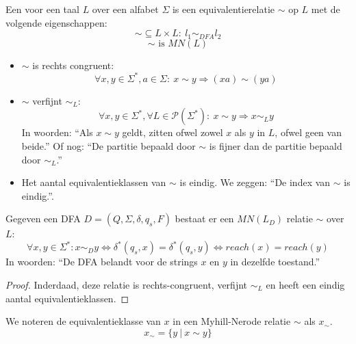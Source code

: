 \documentclass[main.tex]{subfiles}
\begin{document}
\begin{de}
  \label{de:mn-relatie}
  Een  voor een taal $L$ over een alfabet $\Sigma$ is een equivalentierelatie $\sim$ op $L$ met de volgende eigenschappen:
  \[ \sim \subseteq L \times L:\ l_{1} \sim_{DFA} l_{2}\]
  \[ \sim \text{ is } MN(L) \]
  \begin{itemize}
  \item $\sim$ is rechts congruent:
    \[ \forall x,y \in \Sigma^{*}, a \in \Sigma:\ x \sim y \Rightarrow (xa) \sim (ya) \]
  \item $\sim$ verfijnt $\sim_{L}$:
    \[ \forall x,y \in \Sigma^{*}, \forall L\in \mathcal{P}(\Sigma^{*}):\ x \sim y \Rightarrow x \sim_{L} y\]
    In woorden: ``Als $x \sim y$ geldt, zitten ofwel zowel $x$ als $y$ in $L$, ofwel geen van beide.''
    Of nog: ``De partitie bepaald door $\sim$ is fijner dan de partitie bepaald door $\sim_{L}$.''
  \item Het aantal equivalentieklassen van $\sim$ is eindig.
    We zeggen: ``De index van $\sim$ is eindig.''.
  \end{itemize}
\end{de}

\begin{st}
  \label{st:dfa-naar-mn-relatie}
  Gegeven een DFA $D = (Q,\Sigma,\delta,q_{s},F)$ bestaat er een $MN(L_{D})$ relatie $\sim$ over $L$:
  \[ \forall x,y \in \Sigma^{*}: x \sim_{D} y \Leftrightarrow \delta^{*}(q_{s},x) = \delta^{*}(q_{s},y) \Leftrightarrow reach(x) = reach(y) \]
  In woorden: ``De DFA belandt voor de strings $x$ en $y$ in dezelfde toestand.''
  \begin{proof}
    Inderdaad, deze relatie is rechts-congruent, verfijnt $\sim_{L}$ en heeft een eindig aantal equivalentieklassen.
  \end{proof}
\end{st}

\begin{de}
  We noteren de equivalentieklasse van $x$ in een Myhill-Nerode relatie $\sim$ als $x_{\sim}$.
  \[ x_{\sim} = \{ y\ |\ x \sim y \} \]
\end{de}
\end{document}
